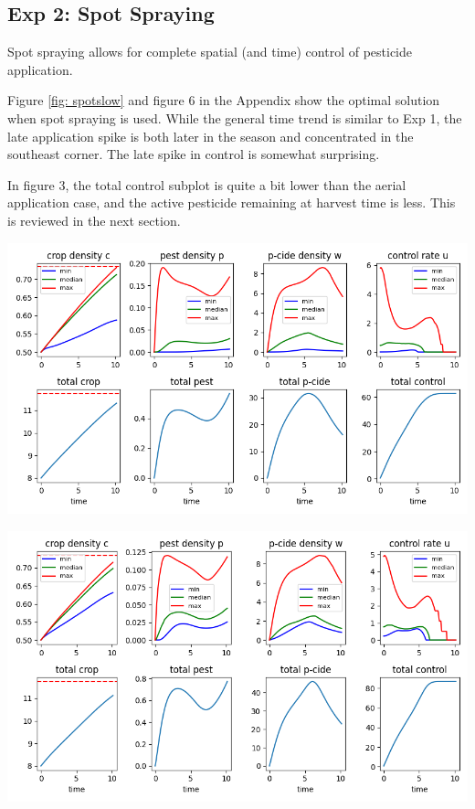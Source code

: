 \documentclass[11pt]{article}
\begin{document}
\subsection{Exp 2: Spot Spraying}

Spot spraying allows for complete spatial (and time) control of pesticide application.

Figure \ref{fig: spotslow} and figure 6 in the Appendix show the optimal solution when spot spraying is used. While the general time trend is similar to Exp 1, the late application spike is both later in the season and concentrated in the southeast corner. The late spike in control is somewhat surprising.

In figure 3, the total control subplot is quite a bit lower than the aerial application case, and the active pesticide remaining at harvest time is less. This is reviewed in the next section.

\begin{minipage}{\textwidth}
	\begin{center}
		\includegraphics[width=0.8\linewidth]{../resim_240718-033400/time.png}
		\label{fig: spotslow}
	\end{center}
\end{minipage}

\begin{minipage}{\textwidth}
	\begin{center}
		\includegraphics[width=0.8\linewidth]{../resim_240718-012904/time.png}
		\label{fig: spotfast}
	\end{center}
\end{minipage}
\end{document}
